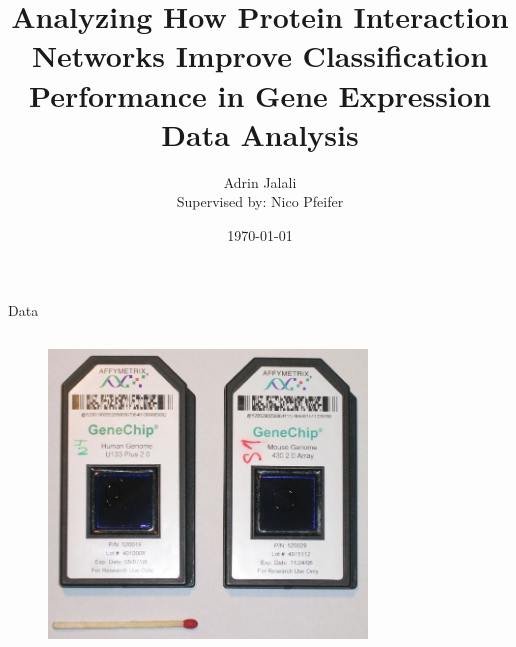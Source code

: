 \documentclass[final]{beamer} %
\title[Gene Expression, PPI Network, Classification]{Analyzing How Protein Interaction Networks Improve Classification Performance in Gene Expression Data Analysis}
\author[Adrin Jalali]{Adrin Jalali \\ \small{Supervised by: Nico Pfeifer}}
\institute{MPI for Informatics}
\date{\today}
\begin{document}
\begin{frame}{} 
  \maketitle
  \begin{block}{Data}
    \begin{columns}[T]
      \begin{column}{0.3\textwidth}
        \begin{columns}
          \begin{column}{0.5\textwidth}
            \begin{figure}
              \includegraphics[width=0.9\textwidth]{Affymetrix-microarray}
            \end{figure}
          \end{column}
          \begin{column}{0.5\textwidth}
            \begin{figure}

\end{figure}
\end{column}
\end{columns}
\end{column}
\end{columns}
\end{block}
\end{frame}
\end{document}
